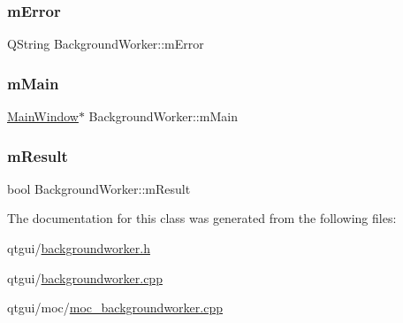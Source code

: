 \subsubsection{\texorpdfstring{mError}{mError}}
{\footnotesize\ttfamily Q\+String Background\+Worker\+::m\+Error\hspace{0.3cm}{\ttfamily [protected]}}

\mbox{\label{class_background_worker_a53e73f68a77533d694efd1c75b102cf7}} 
\subsubsection{\texorpdfstring{mMain}{mMain}}
{\footnotesize\ttfamily \mbox{\hyperlink{class_main_window}{Main\+Window}}$\ast$ Background\+Worker\+::m\+Main\hspace{0.3cm}{\ttfamily [protected]}}

\mbox{\label{class_background_worker_a0873b7881ba8f957a52fc93814b97f89}} 
\subsubsection{\texorpdfstring{mResult}{mResult}}
{\footnotesize\ttfamily bool Background\+Worker\+::m\+Result\hspace{0.3cm}{\ttfamily [protected]}}



The documentation for this class was generated from the following files\+:\begin{DoxyCompactItemize}
\item 
qtgui/\mbox{\hyperlink{backgroundworker_8h}{backgroundworker.\+h}}\item 
qtgui/\mbox{\hyperlink{backgroundworker_8cpp}{backgroundworker.\+cpp}}\item 
qtgui/moc/\mbox{\hyperlink{moc__backgroundworker_8cpp}{moc\+\_\+backgroundworker.\+cpp}}\end{DoxyCompactItemize}
